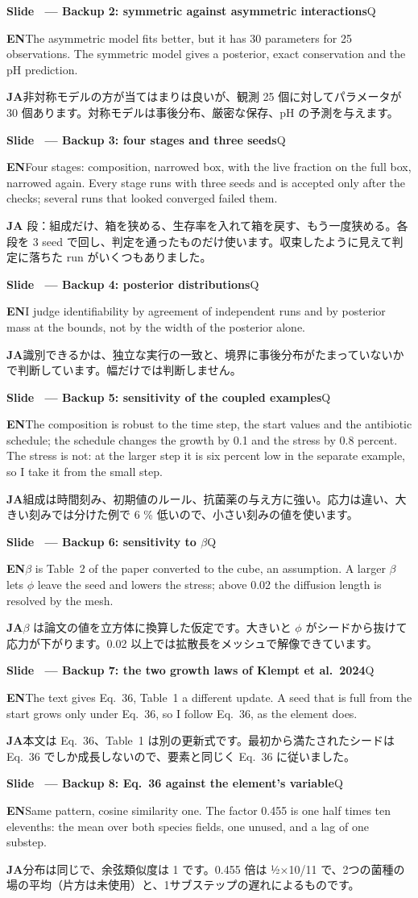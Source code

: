 \documentclass[11pt,a4paper]{article}
\newcounter{sl}
\newcommand{\slide}[2]{\stepcounter{sl}\vspace{8pt}%
  {\color{c3}\large\bfseries Slide \thesl\ --- #1}\hfill{\small #2}\par\vspace{2pt}}
\newcommand{\EN}{\textbf{EN}\quad}
\newcommand{\JA}{\par\textbf{JA}\quad}
\begin{document}
\slide{Backup 2: symmetric against asymmetric interactions}{Q}
\EN The asymmetric model fits better, but it has 30 parameters for 25 observations. The symmetric model gives a posterior, exact conservation and the pH prediction.
\JA 非対称モデルの方が当てはまりは良いが、観測 25 個に対してパラメータが 30 個あります。対称モデルは事後分布、厳密な保存、pH の予測を与えます。

\slide{Backup 3: four stages and three seeds}{Q}
\EN Four stages: composition, narrowed box, with the live fraction on the full box, narrowed again. Every stage runs with three seeds and is accepted only after the checks; several runs that looked converged failed them.
\JA 4 段：組成だけ、箱を狭める、生存率を入れて箱を戻す、もう一度狭める。各段を 3 seed で回し、判定を通ったものだけ使います。収束したように見えて判定に落ちた run がいくつもありました。

\slide{Backup 4: posterior distributions}{Q}
\EN I judge identifiability by agreement of independent runs and by posterior mass at the bounds, not by the width of the posterior alone.
\JA 識別できるかは、独立な実行の一致と、境界に事後分布がたまっていないかで判断しています。幅だけでは判断しません。

\slide{Backup 5: sensitivity of the coupled examples}{Q}
\EN The composition is robust to the time step, the start values and the antibiotic schedule; the schedule changes the growth by 0.1 and the stress by 0.8 percent. The stress is not: at the larger step it is six percent low in the separate example, so I take it from the small step.
\JA 組成は時間刻み、初期値のルール、抗菌薬の与え方に強い。応力は違い、大きい刻みでは分けた例で 6 \% 低いので、小さい刻みの値を使います。

\slide{Backup 6: sensitivity to $\beta$}{Q}
\EN $\beta$ is Table~2 of the paper converted to the cube, an assumption. A larger $\beta$ lets $\phi$ leave the seed and lowers the stress; above 0.02 the diffusion length is resolved by the mesh.
\JA $\beta$ は論文の値を立方体に換算した仮定です。大きいと $\phi$ がシードから抜けて応力が下がります。0.02 以上では拡散長をメッシュで解像できています。

\slide{Backup 7: the two growth laws of Klempt et al.\ 2024}{Q}
\EN The text gives Eq.~36, Table~1 a different update. A seed that is full from the start grows only under Eq.~36, so I follow Eq.~36, as the element does.
\JA 本文は Eq.~36、Table~1 は別の更新式です。最初から満たされたシードは Eq.~36 でしか成長しないので、要素と同じく Eq.~36 に従いました。

\slide{Backup 8: Eq.~36 against the element's variable}{Q}
\EN Same pattern, cosine similarity one. The factor 0.455 is one half times ten elevenths: the mean over both species fields, one unused, and a lag of one substep.
\JA 分布は同じで、余弦類似度は 1 です。0.455 倍は ½×10/11 で、2つの菌種の場の平均（片方は未使用）と、1サブステップの遅れによるものです。
\end{document}
